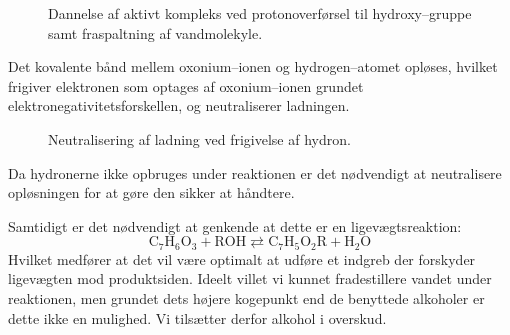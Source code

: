     \begin{figure}[H]
        \caption{Dannelse af aktivt kompleks ved protonoverførsel til hydroxy--gruppe samt fraspaltning af vandmolekyle.}
    \end{figure}
    Det kovalente bånd mellem oxonium--ionen og hydrogen--atomet opløses, hvilket frigiver elektronen som optages af oxonium--ionen grundet elektronegativitetsforskellen, og neutraliserer ladningen.
    \begin{figure}[H]
        \caption{Neutralisering af ladning ved frigivelse af hydron.}
    \end{figure}
    Da hydronerne ikke opbruges under reaktionen er det nødvendigt at neutralisere opløsningen for at gøre den sikker at håndtere.

    Samtidigt er det nødvendigt at genkende at dette er en ligevægtsreaktion: 
    \[
    \mathrm{C_7H_6O_3+ROH} \rightleftarrows \mathrm{C_7H_5O_2R+H_2O}
    \] 
    Hvilket medfører at det vil være optimalt at udføre et indgreb der forskyder ligevægten mod produktsiden. Ideelt villet vi kunnet fradestillere vandet under reaktionen, men grundet dets højere kogepunkt end de benyttede alkoholer er dette ikke en mulighed. Vi tilsætter derfor alkohol i overskud.
    
